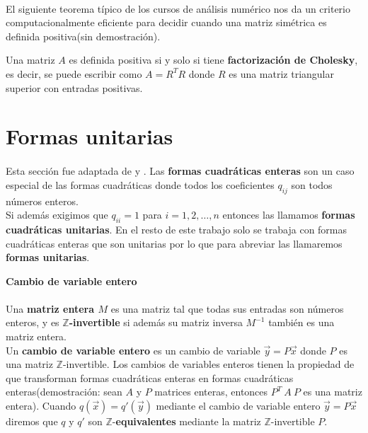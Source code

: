\paragraph{}
El siguiente teorema típico de los cursos de análisis numérico nos da un criterio computacionalmente eficiente para decidir cuando una matriz simétrica es definida positiva(sin demostración).
\begin{theorem}
Una matriz $A$ es definida positiva si y solo si tiene \textbf{factorización de Cholesky}, es decir, se puede escribir como $A=R^{T}R$ donde $R$ es una matriz triangular superior con entradas positivas.
\label{teorema:1.5}
\end{theorem}
\section{Formas unitarias}
\paragraph*{}
Esta sección fue adaptada de \citep{Ringel1985TameAA} y \citep{alma991031505829703276}. Las \textbf{formas cuadráticas enteras} son un caso especial de las formas cuadráticas donde todos los coeficientes $q_{ij}$ son todos números enteros.\\
Si además exigimos que $q_{ii} = 1$ para $i = 1, 2, \ldots, n$ entonces las llamamos \textbf{formas cuadráticas unitarias}. En el resto de este trabajo solo se trabaja con formas cuadráticas enteras que son unitarias por lo que  para abreviar las llamaremos \textbf{formas unitarias}.

\newpage
\textbf{Cambio de variable entero}
\paragraph*{}
Una \textbf{matriz entera $M$} es una matriz tal que todas sus entradas son números enteros, y es $\mathbb{Z}$\textbf{-invertible} si además su matriz inversa $M^{-1}$ también es una matriz entera.\\ Un \textbf{cambio de variable entero} es un cambio de variable $\overrightarrow{y} = P\overrightarrow{x}$ donde $P$ es una matriz $\mathbb{Z}$-invertible. Los cambios de variables enteros tienen la propiedad de que transforman formas cuadráticas enteras en formas cuadráticas enteras(demostración: sean $A$ y $P$ matrices enteras, entonces $P^{T}~A~P$ es una matriz entera). Cuando $q(\overrightarrow{x}) = q'(\overrightarrow{y})$ mediante el cambio de variable entero $\overrightarrow{y} = P\overrightarrow{x}$ diremos que $q$ y $q'$ son $\mathbb{Z}$-\textbf{equivalentes} mediante la matriz $\mathbb{Z}$-invertible $P$.
